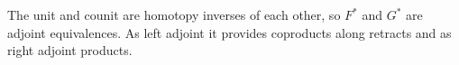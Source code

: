 \documentclass{amsart}
\theoremstyle{plain}
\theoremstyle{definition}
\newcommand\hide[1]{}
\newcommand\id{\mathrm{id}}
\begin{document}
The unit and counit are homotopy inverses of each other, so $F^*$ and $G^*$ are adjoint equivalences. As left adjoint it provides coproducts along retracts and as right adjoint products.

\hide{
The following also hold:
\begin{align*}
A(B(x)) &= A(\Phi(x),K(D(\Phi(x))^{-1},x)) = K(D(\Phi(x)),K(D(\Phi(x))^{-1},x))\\
&= K(\id,x) = x \\
B(A(j,x)) &= B(K(D(j),x))\\
&= (\Phi(K(D(j),x)),K(D(\Phi(K(D(j),x)))^{-1},K(D(j),x)))\\
&= (j,K(D(j)^{-1},K(D(j),x)) = (j,x)
\end{align*}
}
\end{document}
